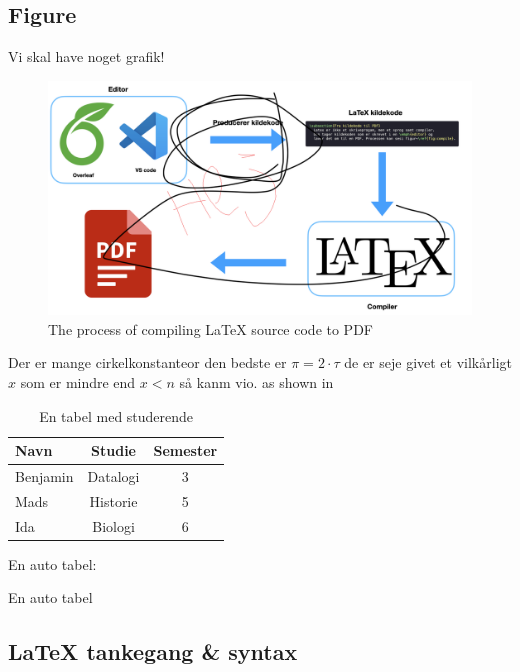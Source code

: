 \documentclass{article}
\begin{document}
\subsection{Figure}
Vi skal have noget grafik!
\begin{figure}
\centering
\includegraphics[width=0.8\linewidth]{assets/compile.png}
\caption{The process of compiling \LaTeX{} source code to PDF}
\label{fig:compile}
\end{figure}

Der er mange cirkelkonstanteor den bedste er \(\pi = 2 \cdot \tau\) de er seje
givet et vilkårligt \(x\) som er mindre end \(x < n\) så kanm vio.
as shown in\cite{latexPackage}


\newpage
\appendix
{}


\begin{table}
	\centering
	\begin{tabular}{l | c | c }
		Navn     & Studie   & Semester \\ \hline
		Benjamin & Datalogi & 3        \\ \hline
		Mads     & Historie & 5        \\ \hline
		Ida      & Biologi  & 6        \\ \hline
	\end{tabular}
	\caption{En tabel med studerende}
	\label{tab:studerende}
\end{table}

En auto tabel:
\begin{table}
	\centering
	\caption{En auto tabel}
	\label{tab:studerende}
\end{table}

\newpage
\appendix
{}


\newpage
\subsection{\LaTeX{} tankegang \& syntax}
\end{document}
